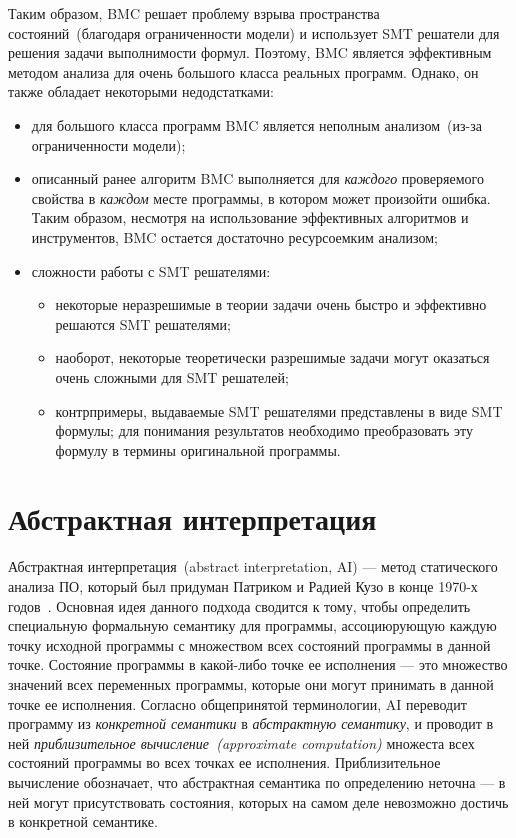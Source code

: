 Таким образом, BMC решает проблему взрыва пространства состояний~(благодаря 
ограниченности модели) и использует SMT решатели для решения задачи 
выполнимости формул. Поэтому, BMC является эффективным методом анализа для 
очень большого класса реальных программ. Однако, он также обладает некоторыми 
недодстатками:
\begin{itemize}
\item для большого класса программ BMC является неполным анализом~(из-за 
ограниченности модели);

\item описанный ранее алгоритм BMC выполняется для \emph{каждого} 
проверяемого свойства в \emph{каждом} месте программы, в котором может 
произойти ошибка. Таким образом, несмотря на использование эффективных 
алгоритмов и инструментов, BMC остается достаточно ресурсоемким анализом;

\item сложности работы с SMT решателями:
	\begin{itemize}
	\item некоторые неразрешимые в теории задачи очень быстро и эффективно 
	решаются SMT решателями;
	\item наоборот, некоторые теоретически разрешимые задачи могут оказаться
	очень сложными для SMT решателей;
	\item контрпримеры, выдаваемые SMT решателями представлены в виде 
	SMT формулы; для понимания результатов необходимо преобразовать эту формулу
	в термины оригинальной программы.
	\end{itemize}
\end{itemize}

\section{Абстрактная интерпретация}
Абстрактная интерпретация~(abstract interpretation, AI) --- метод 
статического анализа ПО, который был придуман Патриком и Радией Кузо в конце 
1970-х годов~\cite{ai}. Основная идея данного подхода сводится к тому, чтобы 
определить специальную формальную семантику для программы, ассоциюрующую 
каждую точку исходной программы с множеством всех состояний программы в данной 
точке. Состояние программы в какой-либо точке ее исполнения --- это множество 
значений всех переменных программы, которые они могут принимать в данной точке 
ее исполнения. Согласно общепринятой терминологии, AI переводит программу из 
\emph{конкретной семантики} в \emph{абстрактную семантику}, и проводит в ней 
\emph{приблизительное вычисление~(approximate computation)} множеста всех
состояний программы во всех точках ее исполнения. Приблизительное вычисление 
обозначает, что абстрактная семантика по определению неточна --- в ней могут 
присутствовать состояния, которых на самом деле невозможно достичь в 
конкретной семантике.

